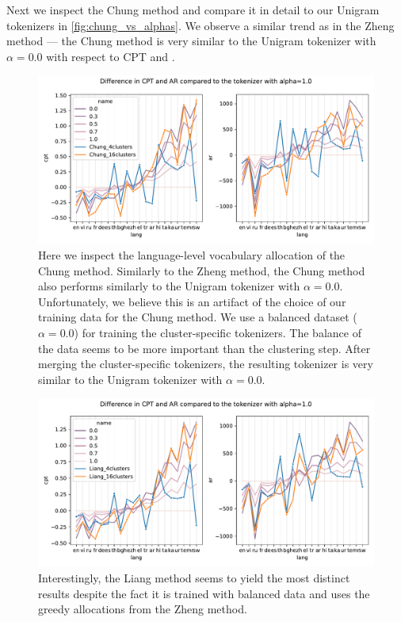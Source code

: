 Next we inspect the Chung method and compare it in detail to our Unigram tokenizers in \autoref{fig:chung_vs_alphas}. We observe a similar trend as in the Zheng method --- the Chung method is very similar to the Unigram tokenizer with $\alpha=0.0$ with respect to CPT and .

\begin{figure}[H]
    \centering
    \includegraphics[width=\textwidth]{figures/chung_vs_alphas.pdf}
    \caption{Here we inspect the language-level vocabulary allocation of the Chung method. Similarly to the Zheng method, the Chung method also performs similarly to the Unigram tokenizer with $\alpha=0.0$. Unfortunately, we believe this is an artifact of the choice of our training data for the Chung method. We use a balanced dataset ($\alpha=0.0$) for training the cluster-specific tokenizers. The balance of the data seems to be more important than the clustering step. After merging the cluster-specific tokenizers, the resulting tokenizer is very similar to the Unigram tokenizer with $\alpha=0.0$.}
    \label{fig:chung_vs_alphas}
\end{figure}

\begin{figure}[H]
    \centering
    \includegraphics[width=\textwidth]{figures/liang_vs_alphas.pdf}
    \caption{Interestingly, the Liang method seems to yield the most distinct results despite the fact it is trained with balanced data and uses the greedy allocations from the Zheng method. }
    \label{fig:liang_vs_alphas}
\end{figure}

